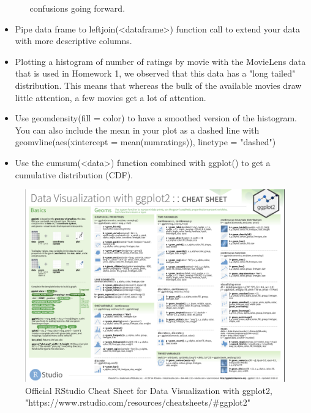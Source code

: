 \begin{itemize}
\begin{enumerate}
        confusions going forward.
    \end{enumerate}
    \item Pipe data frame to leftjoin(<dataframe>) function call to extend your data with
    more descriptive columns.
    \item Plotting a histogram of number of ratings by movie with the MovieLens data that
    is used in Homework 1, we observed that this data has a "long tailed" distribution.
    This means that whereas the bulk of the available movies draw little attention, a few
    movies get a lot of attention. 
    \item Use geomdensity(fill = color) to  have a smoothed version of the histogram. You
    can also include the mean in your plot as a dashed line with geomvline(aes(xintercept
    = mean(numratings)), linetype = "dashed")
    \item Use the cumsum(<data>)  function combined with ggplot() to get a cumulative
    distribution (CDF).
\end{itemize}

\begin{figure}[ht]
  \begin{center}
    \includegraphics[width=1\textwidth]{figures/data_visualization.png}
    \caption{Official RStudio Cheat Sheet for Data Visualization with 
    ggplot2, "https://www.rstudio.com/resources/cheatsheets/#ggplot2"}
    \label{fig:example_figure}
  \end{center}
\end{figure}
